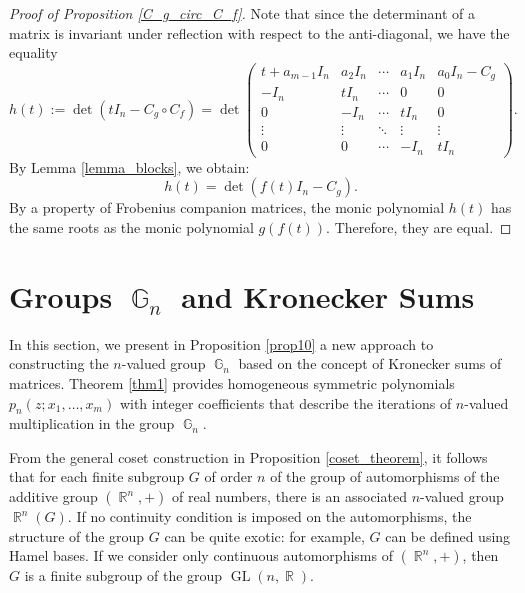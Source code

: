 \documentclass[14pt, dvipsnames]{extarticle}
\theoremstyle{definition}
\theoremstyle{definition}
\theoremstyle{remark}
\DeclareMathOperator{\G}{\mathbb{G}}
\DeclareMathOperator{\R}{\mathbb{R}}
\DeclareMathOperator{\GL}{\mathrm{GL}}
\begin{document}
\begin{proof}[Proof of Proposition \ref{C_g_circ_C_f}]
Note that since the determinant of a matrix is invariant under reflection with respect to the anti-diagonal, we have the equality
$$h(t) := \det(tI_n - C_g\circ C_f) = \det\left(\begin{array}{ccccc}
t+a_{m-1}I_{n} & a_{2}I_{n} & \cdots & a_{1}I_{n} & a_{0}I_{n}-C_{g}\\
-I_{n} & tI_n & \cdots & 0 & 0\\
0 & -I_{n} & \cdots & tI_n & 0\\
\vdots & \vdots & \ddots & \vdots & \vdots\\
0 & 0 & \cdots & -I_{n} & tI_n
\end{array}\right).$$
By Lemma \ref{lemma_blocks}, we obtain:
\begin{equation}\label{g(f)_composition}
h(t) = \det(f(t)I_n - C_g).
\end{equation}
By a property of Frobenius companion matrices, the monic polynomial $h(t)$ has the same roots as the monic polynomial $g(f(t))$. Therefore, they are equal.
\end{proof}















\section{Groups $\G_n$ and Kronecker Sums}\label{Kronecker}\label{G_n_and_Kronecker}

In this section, we present in Proposition \ref{prop10} a new approach to constructing the $n$-valued group $\G_n$ based on the concept of Kronecker sums of matrices. Theorem \ref{thm1} provides homogeneous symmetric polynomials $p_n(z; x_1, \dots, x_m)$ with integer coefficients that describe the iterations of $n$-valued multiplication in the group $\G_n$.

From the general coset construction in Proposition \ref{coset_theorem}, it follows that for each finite subgroup $G$ of order $n$ of the group of automorphisms of the additive group $(\R^n, +)$ of real numbers, there is an associated $n$-valued group $\R^n(G)$. If no continuity condition is imposed on the automorphisms, the structure of the group $G$ can be quite exotic: for example, $G$ can be defined using Hamel bases. If we consider only continuous automorphisms of $(\R^n, +)$, then $G$ is a finite subgroup of the group $\GL(n, \R)$.
\end{document}
